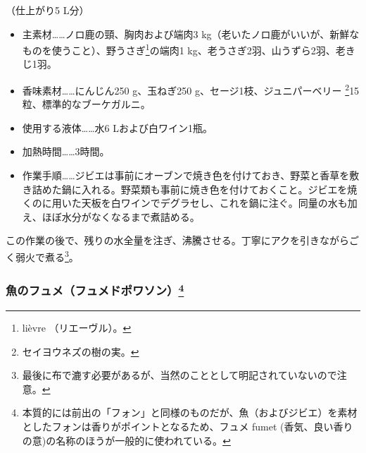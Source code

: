 \begin{recette}

（仕上がり5 L分）

\begin{itemize}
\item
  主素材\ldots{}\ldots{}ノロ鹿の頸、胸肉および端肉3
  kg（老いたノロ鹿がいいが、新鮮なものを使うこと）、野うさぎ\footnote{lièvre
    （リエーヴル）。}の端肉1 kg、老うさぎ2羽、山うずら2羽、老きじ1羽。
\item
  香味素材\ldots{}\ldots{}にんじん250 g、玉ねぎ250
  g、セージ1枝、ジュニパーベリー \footnote{セイヨウネズの樹の実。}15粒、標準的なブーケガルニ。
\end{itemize}

\begin{itemize}
\item
  使用する液体\ldots{}\ldots{}水6 Lおよび白ワイン1瓶。
\item
  加熱時間\ldots{}\ldots{}3時間。
\item
  作業手順\ldots{}\ldots{}ジビエは事前にオーブンで焼き色を付けておき、野菜と香草を敷き詰めた鍋に入れる。野菜類も事前に焼き色を付けておくこと。ジビエを焼くのに用いた天板を白ワインでデグラセし、これを鍋に注ぐ。同量の水も加え、ほぼ水分がなくなるまで煮詰める。
\end{itemize}

この作業の後で、残りの水全量を注ぎ、沸騰させる。丁寧にアクを引きながらごく弱火で煮る\footnote{最後に布で漉す必要があるが、当然のこととして明記されていないので注意。}。

\hypertarget{fumet-de-poisson}{%
\subsubsection[魚のフュメ（フュメドポワソン）]{\texorpdfstring{魚のフュメ（フュメドポワソン）\footnote{本質的には前出の「フォン」と同様のものだが、魚（およびジビエ）を素材としたフォンは香りがポイントとなるため、フュメ
  fumet (香気、良い香りの意)の名称のほうが一般的に使われている。}}{魚のフュメ（フュメドポワソン）}}\label{fumet-de-poisson}}




\end{recette}
